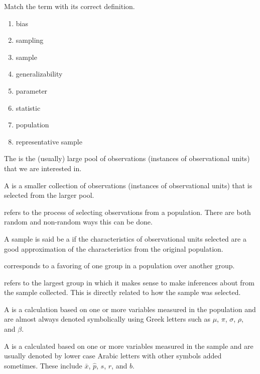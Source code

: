 \documentclass[11pt]{exam}
\begin{document}
\noprintanswers   %


\headrule
\footer{}{}{}

\renewcommand{\theenumi}{\Alph{enumi}}

Match the term with its correct definition.

\begin{enumerate}
	\item bias
	\item sampling
	\item sample
	\item generalizability
	\item parameter
	\item statistic
	\item population
	\item representative sample
\end{enumerate}

\begin{questions}

\question The  \fillin is the (usually) large pool of observations (instances of observational units) that we are interested in.

\question A  \fillin  is a smaller collection of observations (instances of observational units) that is selected from the larger pool.

\question  \fillin  refers to the process of selecting observations from a population.  There are both random and non-random ways this can be done.

\question A sample is said be a  \fillin  if the characteristics of observational units selected are a good approximation of the characteristics from the original population.

\question \fillin corresponds to a favoring of one group in a population over another group.

\question \fillin refers to the largest group in which it makes sense to make inferences about from the sample collected.  This is directly related to how the sample was selected.

\question A 
\fillin is a calculation based on one or more variables measured in the population and  are almost always denoted symbolically using Greek letters such as $\mu$, $\pi$, $\sigma$, $\rho$, and $\beta$.

\question A \fillin is a calculated based on one or more variables measured in the sample and are usually denoted by lower case Arabic letters with other symbols added sometimes.  These include $\bar{x}$, $\hat{p}$, $s$, $r$, and $b$. 

\end{questions}
\end{document}
